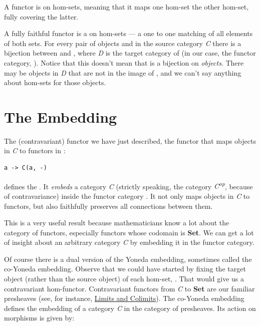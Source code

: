 A  functor is  on hom-sets, meaning that it
maps one hom-set  the other hom-set, fully covering the
latter.

A fully faithful functor  is a  on hom-sets
--- a one to one matching of all elements of both sets. For every pair
of objects  and  in the source category \emph{C}
there is a bijection between  and
, where \emph{D} is the target category of
 (in our case, the functor category, \code{{[}C,\ Set{]}}).
Notice that this doesn't mean that  is a bijection on
\emph{objects}. There may be objects in \emph{D} that are not in the
image of , and we can't say anything about hom-sets for those
objects.

\section{The Embedding}\label{the-embedding}

The (contravariant) functor we have just described, the functor that
maps objects in \emph{C} to functors in \code{{[}C,\ Set{]}}:

\begin{verbatim}
a -> C(a, -)
\end{verbatim}

defines the . It \emph{embeds} a category
\emph{C} (strictly speaking, the category \emph{C\textsuperscript{op}},
because of contravariance) inside the functor category
\code{{[}C,\ Set{]}}. It not only maps objects in \emph{C} to
functors, but also faithfully preserves all connections between them.

This is a very useful result because mathematicians know a lot about the
category of functors, especially functors whose codomain is
\textbf{Set}. We can get a lot of insight about an arbitrary category
\emph{C} by embedding it in the functor category.

Of course there is a dual version of the Yoneda embedding, sometimes
called the co-Yoneda embedding. Observe that we could have started by
fixing the target object (rather than the source object) of each
hom-set, . That would give us a contravariant
hom-functor. Contravariant functors from \emph{C} to \textbf{Set} are
our familiar presheaves (see, for instance,
\href{https://bartoszmilewski.com/2015/04/15/limits-and-colimits/}{Limits
and Colimits}). The co-Yoneda embedding defines the embedding of a
category \emph{C} in the category of presheaves. Its action on morphisms
is given by:

